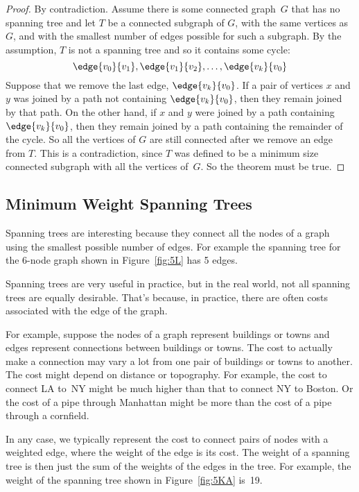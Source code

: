 \begin{proof}
By contradiction.  Assume there is some connected graph~$G$ that has
no spanning tree and let $T$ be a connected subgraph of $G$, with the
same vertices as $G$, and with the smallest number of edges possible
for such a subgraph.  By the assumption, $T$ is not a spanning tree
and so it contains some cycle:
\[
\edge{v_0}{v_1}, \edge{v_1}{v_2}, \dots, \edge{v_k}{v_0}
\]
Suppose that we remove the last edge, $\edge{v_k}{v_0}$.  If a pair of
vertices $x$ and $y$ was joined by a path not containing
$\edge{v_k}{v_0}$, then they remain joined by that path.  On the other
hand, if $x$ and $y$ were joined by a path containing $\edge{v_k}{v_0}$,
then they remain joined by a path containing the remainder of the cycle.
So all the vertices of $G$ are still connected after we remove an edge
from $T$.  This is a contradiction, since $T$ was defined to be a minimum
size connected subgraph with all the vertices of~$G$.  So the theorem
must be true.
\end{proof}

\subsection{Minimum Weight Spanning Trees}

Spanning trees are interesting because they connect all the nodes of a
graph using the smallest possible number of edges.  For example the
spanning tree for the 6-node graph shown in Figure~\ref{fig:5L} has 5
edges.

Spanning trees are very useful in practice, but in the real world, not
all spanning trees are equally desirable.  That's because, in
practice, there are often costs associated with the edge of the graph.

For example, suppose the nodes of a graph represent buildings or towns
and edges represent connections between buildings or towns.  The cost
to actually make a connection may vary a lot from one pair of
buildings or towns to another.  The cost might depend on distance or
topography.  For example, the cost to connect LA to~NY might be much
higher than that to connect NY to Boston.  Or the cost of a pipe
through Manhattan might be more than the cost of a pipe through a
cornfield.

In any case, we typically represent the cost to connect pairs of nodes
with a weighted edge, where the weight of the edge is its cost.  The
weight of a spanning tree is then just the sum of the weights of the
edges in the tree.  For example, the weight of the spanning tree shown
in Figure~\ref{fig:5KA} is~19.

